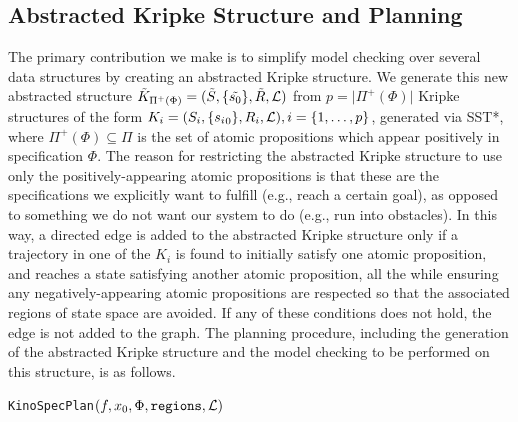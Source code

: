\subsection{Abstracted Kripke Structure and Planning}

The primary contribution we make is to simplify model checking over several data structures by creating an abstracted Kripke structure. We generate this new abstracted structure ${\tilde{K}_{\Pi^+(\Phi)} = (\tilde{S}, \{ \tilde{s_0} \}, \tilde{R}, \mathcal{L})}$ from $p = \lvert {\Pi^+(\Phi)} \rvert$ Kripke structures of the form ${K_i = (S_i, \{ {s_i}_0 \}, R_i, \mathcal{L})}, i = \{1, \mathellipsis, p \}$, generated via SST*, where $\Pi^+(\Phi) \subseteq \Pi$ is the set of atomic propositions which appear positively in specification $\Phi$. The reason for restricting the abstracted Kripke structure to use only the positively-appearing atomic propositions is that these are the specifications we explicitly want to fulfill (e.g., reach a certain goal), as opposed to something we do not want our system to do (e.g., run into obstacles). In this way, a directed edge is added to the abstracted Kripke structure only if a trajectory in one of the $K_i$ is found to initially satisfy one atomic proposition, and reaches a state satisfying another atomic proposition, all the while ensuring any negatively-appearing atomic propositions are respected so that the associated regions of state space are avoided. If any of these conditions does not hold, the edge is not added to the graph. The planning procedure, including the generation of the abstracted Kripke structure and the model checking to be performed on this structure, is as follows.

\begin{algorithm}
\caption{\texttt{KinoSpecPlan}$(f, x_0, \Phi, \texttt{regions}, \mathcal{L})$}
\label{alg:kinospecplan}
\begin{algorithmic}[1]
    \label{alg:kinoplan:start}
    \label{alg:kinoplan:start2}
    \label{alg:kinoplan:initK}
        \label{alg:kinoplan:initK2}
    \EndFor{}
    \label{alg:kinoplan:sst}
            \label{alg:kinoplan:sst2}
        \EndFor{}
        \label{alg:kinoplan:abstract}
    \EndWhile{}
    \label{alg:kinoplan:end}
\end{algorithmic}{}
\end{algorithm}

